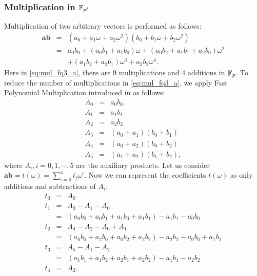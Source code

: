 \subsubsection{Multiplication in $\mathbb{F}_{p^3}$}
Multiplication of two arbitrary vectors is performed as follows:
\begin{eqnarray}
\textbf{ab} & = & (a_0 + a_1\omega+ a_2\omega^2)(b_0 + b_1\omega+ b_2\omega^2)\nonumber\\
& = & a_0 b_0 + (a_0 b_1+a_1 b_0)\omega + (a_0 b_2 +a_1 b_1 + a_2 b_0)\omega^2 \nonumber \\ 
&  & + (a_1 b_2+a_2 b_1)\omega^3 +a_2b_2\omega^4.  \label{eq:mul_fq3_a}
\end{eqnarray}
Here in \eqref{eq:mul_fq3_a}, there are 9 multiplications and 4 additions in $\mathbb{F}_p$. To reduce the number of multiplications in \eqref{eq:mul_fq3_a}, we apply Fast Polynomial Multiplication introduced in \cite{OEF} as follows:
\begin{eqnarray}\label{eq:FPM}
A_0 & = & a_0b_0\nonumber \\
A_1 & = & a_1b_1\nonumber \\
A_2 & = & a_2b_2\nonumber \\
A_3 & = & (a_0+ a_1)(b_0+b_1)\nonumber \\
A_4 & = & (a_0+ a_2)(b_0+b_2)\nonumber \\
A_5 & = & (a_1+ a_2)(b_1+b_2), 
\end{eqnarray}
where $A_i, i= 0,1, \cdots, 5$ are the auxiliary products. Let us consider $\textbf{ab} = t(\omega) = \sum_{i=0}^{4} t_i\omega^i$.
Now we can represent the coefficients $t(\omega)$ as only additions and subtractions of  $A_i$,
\begin{eqnarray}\label{eq:FPM1}
t_0 & = & A_0\nonumber \\
t_1 & = & A_3 - A_1 - A_0 \nonumber \\
& = & (a_0b_0 +a_0b_1+a_1b_0+a_1b_1)-a_1b_1-a_0b_0 \nonumber \\
t_2 & = & A_4 - A_2 - A_0 + A_1\nonumber \\
& = & (a_0b_0 +a_2b_0+a_0b_2+a_2b_2)-a_2b_2-a_0b_0 +a_1b_1\nonumber \\
t_3 & = & A_5 - A_1 - A_2\nonumber \\
& = & (a_1b_1 +a_1b_2+a_2b_1+a_2b_2)-a_1b_1-a_2b_2 \nonumber \\
t_4 & = & A_2.
\end{eqnarray}
